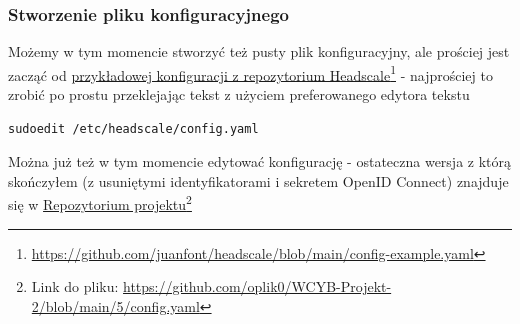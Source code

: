 \documentclass[../main.tex]{subfiles}
\begin{document}
\subsubsection{Stworzenie pliku konfiguracyjnego}

Możemy w tym momencie stworzyć też pusty plik konfiguracyjny, ale prościej jest zacząć od \linebreak
\href{https://github.com/juanfont/headscale/blob/main/config-example.yaml}{przykładowej konfiguracji z repozytorium Headscale}\footnote{\url{https://github.com/juanfont/headscale/blob/main/config-example.yaml}} - najprościej to zrobić po prostu przeklejając tekst z użyciem preferowanego edytora tekstu

\begin{verbatim}
sudoedit /etc/headscale/config.yaml
\end{verbatim}

Można już też w tym momencie edytować konfigurację - ostateczna wersja z którą skończyłem (z usuniętymi identyfikatorami i sekretem OpenID Connect) znajduje się w \href{https://github.com/oplik0/WCYB-Projekt-2/blob/main/5/config.yaml}{Repozytorium projektu}\footnote{Link do pliku: \url{https://github.com/oplik0/WCYB-Projekt-2/blob/main/5/config.yaml}}
\end{document}
